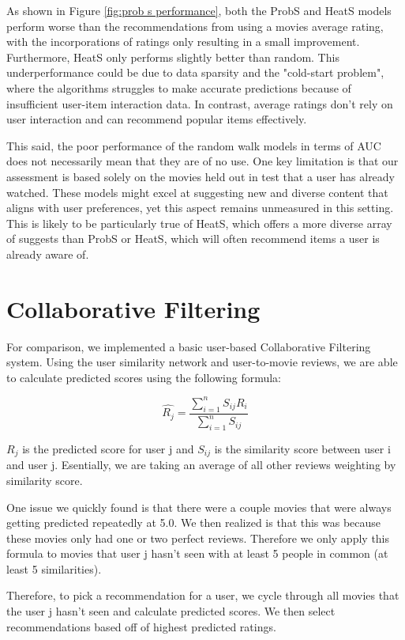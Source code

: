 \documentclass[12pt]{article}
\numberwithin{equation}{section}
\begin{document}
As shown in Figure \ref{fig:prob s performance}, both the ProbS and HeatS models perform worse than the recommendations from using a movies average rating, with the incorporations of ratings only resulting in a small improvement. Furthermore, HeatS only performs slightly better than random. This underperformance could be due to data sparsity and the "cold-start problem", where the algorithms struggles to make accurate predictions because of insufficient user-item interaction data. In contrast, average ratings don't rely on user interaction and can recommend popular items effectively.

This said, the poor performance of the random walk models in terms of AUC does not necessarily mean that they are of no use.  One key limitation is that our assessment is based solely on the movies held out in test that a user has already watched. These models might excel at suggesting new and diverse content that aligns with user preferences, yet this aspect remains unmeasured in this setting. This is likely to be particularly true of HeatS, which offers a more diverse array of suggests than ProbS or HeatS, which will often recommend items a user is already aware of.

\section{Collaborative Filtering}
For comparison, we implemented a basic user-based Collaborative Filtering system. Using the user similarity network and user-to-movie reviews, we are able to calculate predicted scores using the following formula:

\[
\hat{R_j} = \frac{\sum_{i=1}^n S_{ij}R_i}{\sum_{i=1}^n S_{ij}}
\]

$R_j$ is the predicted score for user j and $S_{ij}$ is the similarity score between user i and user j. Esentially, we are taking an average of all other reviews weighting by similarity score.

One issue we quickly found is that there were a couple movies that were always getting predicted repeatedly at 5.0.  We then realized is that this was because these movies only had one or two perfect reviews. Therefore we only apply this formula to movies that user j hasn't seen with at least 5 people in common (at least 5 similarities).

Therefore, to pick a recommendation for a user, we cycle through all movies that the user j hasn't seen and calculate predicted scores. We then select recommendations based off of highest predicted ratings.
\end{document}

